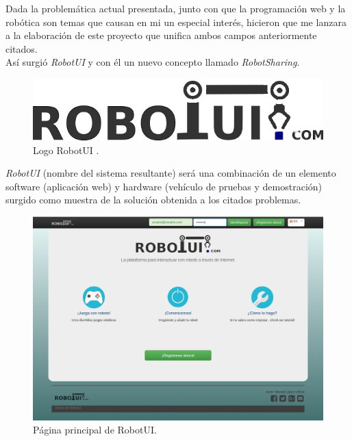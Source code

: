 Dada la problemática actual presentada, junto con que la programación web y la robótica son temas que causan en mi un especial interés, hicieron que me lanzara a la elaboración de este proyecto que unifica ambos campos anteriormente citados.\\

Así surgió \emph{RobotUI} y con él un nuevo concepto llamado \textit{RobotSharing}.\\

\begin{figure}[H]
  \begin{center}
    \includegraphics[scale=0.5]{imagenes/logotipo.png}
  \end{center}
  \label{fig:logo}
 \caption{Logo RobotUI \protect\footnotemark.}
\end{figure}


\emph{RobotUI} (nombre del sistema resultante) será una combinación de un elemento software (aplicación web) y hardware (vehículo de pruebas y demostración) surgido como muestra de la solución obtenida a los citados problemas.\\



\begin{figure}[H]
  \begin{center}
    \includegraphics[scale=0.3]{imagenes/manual-usuario/pagina-principal.png}
  \end{center}
  \label{fig:logo}
 \caption{Página principal de RobotUI.}
\end{figure}



